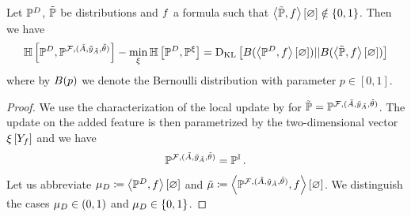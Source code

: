 \begin{lemma}
    Let $\mathbb{P}^{D}$, $\tilde{\mathbb{P}}$ be distributions and $f$ a formula such that $\left\langle \tilde{\mathbb{P}},f\right\rangle \left[ \varnothing \right]\notin\{0,1\}$.
    Then we have
    \begin{align*}
        \mathbb{H}\left[\mathbb{P}^{D},\mathbb{P}^{\mathcal{F},(\tilde{A},\tilde{y}_{\tilde{A}},\tilde{\theta})}\right]
        - \min_{\xi} \mathbb{H}\left[\mathbb{P}^{D},\mathbb{P}^{\xi}\right]
        = \mathrm{D}_{\mathrm{KL}}\left[ B(\left\langle \mathbb{P}^{D},f\right\rangle \left[ \varnothing \right]) || B(\left\langle \tilde{\mathbb{P}},f\right\rangle \left[ \varnothing \right]) \right]
    \end{align*}
    where by $B(p)$ we denote the Bernoulli distribution with parameter $p\in[0,1]$.
\end{lemma}
\begin{proof}
    We use the characterization of the local update by  for $\tilde{\mathbb{P}}=\mathbb{P}^{\mathcal{F},(\tilde{A},\tilde{y}_{\tilde{A}},\tilde{\theta})}$.
    The update on the added feature is then parametrized by the two-dimensional vector $\xi\left[Y_{f}\right]$ and we have
    \begin{align*}
        \mathbb{P}^{\mathcal{F},(\tilde{A},\tilde{y}_{\tilde{A}},\tilde{\theta})} = \mathbb{P}^{\mathbb{I}} \, .
    \end{align*}
    Let us abbreviate $\mu_{D}\coloneqq\left\langle \mathbb{P}^{D},f\right\rangle \left[ \varnothing \right]$ and $\tilde{\mu}\coloneqq\left\langle \mathbb{P}^{\mathcal{F},(\tilde{A},\tilde{y}_{\tilde{A}},\tilde{\theta})},f\right\rangle \left[ \varnothing \right]$.
    We distinguish the cases $\mu_{D}\in(0,1)$ and $\mu_{D}\in\{0,1\}$.


\end{proof}
